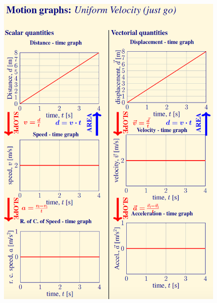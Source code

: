 %
\newpage

\begin{figure}[H]
    \centering
    \includegraphics[scale=1.1]{FIG1.png}
\end{figure}

\newpage

